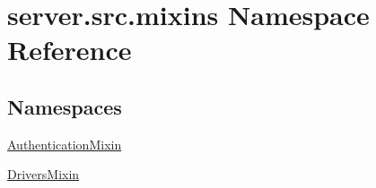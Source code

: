 \hypertarget{namespaceserver_1_1src_1_1mixins}{}\section{server.\+src.\+mixins Namespace Reference}
\label{namespaceserver_1_1src_1_1mixins}
\subsection*{Namespaces}
\begin{DoxyCompactItemize}
\item 
 \hyperlink{namespaceserver_1_1src_1_1mixins_1_1_authentication_mixin}{Authentication\+Mixin}
\item 
 \hyperlink{namespaceserver_1_1src_1_1mixins_1_1_drivers_mixin}{Drivers\+Mixin}
\end{DoxyCompactItemize}
